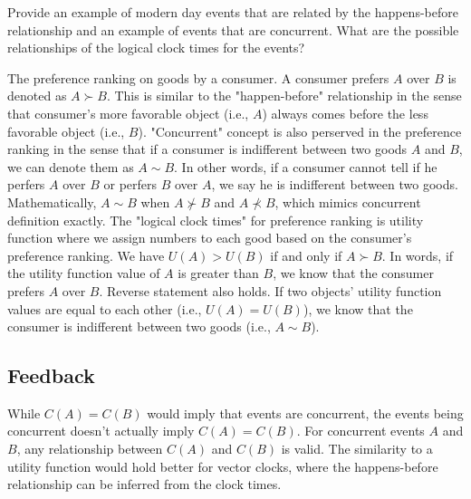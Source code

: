 \begin{QandA}
   \item Provide an example of modern day events that are related by the happens-before relationship and an example of events that are concurrent. What are the possible relationships of the logical clock times for the events?
         \begin{answered}
		 The preference ranking on goods by a consumer. A consumer prefers $A$ over $B$ is denoted as $A \succ B$. This is similar to the "happen-before" relationship in the sense that consumer's more favorable object (i.e., $A$)
		 always comes before the less favorable object (i.e., $B$). "Concurrent" concept is also perserved in the preference ranking in the sense that if a consumer is indifferent between two goods $A$ and $B$, we can denote
		 them as $A \sim B$. In other words, if a consumer cannot tell if he perfers $A$ over $B$ or perfers $B$ over $A$, we say he is indifferent between two goods. Mathematically, $A \sim B$ when $A \nsucc B$ and $A \nprec B$,
		 which mimics concurrent definition exactly. The "logical clock times" for preference ranking is utility function where we assign numbers to each good based on the consumer's preference ranking.
		 We have $U(A) > U(B)$ if and only if $A \succ B$. In words, if the utility function value of $A$
		 is greater than $B$, we know that the consumer prefers $A$ over $B$. Reverse statement also holds. If two objects' utility function values are equal to each other (i.e., $U(A) = U(B)$), we know that the consumer
		 is indifferent between two goods (i.e., $A \sim B$).
         \end{answered}
\end{QandA}

\subsection{Feedback}

While $C(A) = C(B)$ would imply that events are concurrent, the events being concurrent doesn't actually imply $C(A) = C(B)$. 
For concurrent events $A$ and $B$, any relationship between $C(A)$ and $C(B)$ is valid. The similarity to a utility function would hold better for vector clocks, where the happens-before relationship can be inferred from the clock times.